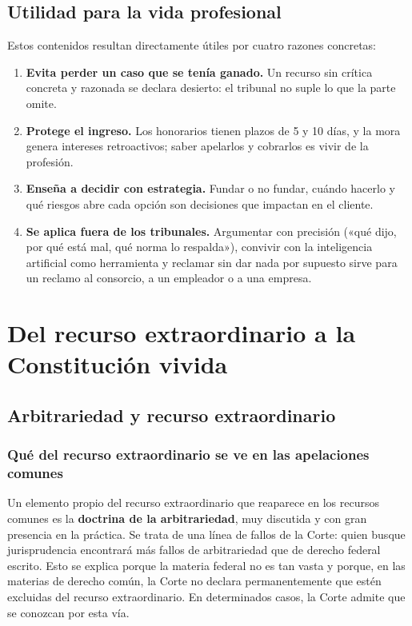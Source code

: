 \documentclass[12pt,oneside]{book}
\begin{document}
\section{Utilidad para la vida profesional}

\begin{note}
Estos contenidos resultan directamente útiles por cuatro razones concretas:
\begin{enumerate}
    \item \textbf{Evita perder un caso que se tenía ganado.} Un recurso sin crítica concreta y razonada se declara desierto: el tribunal no suple lo que la parte omite.
    \item \textbf{Protege el ingreso.} Los honorarios tienen plazos de 5 y 10 días, y la mora genera intereses retroactivos; saber apelarlos y cobrarlos es vivir de la profesión.
    \item \textbf{Enseña a decidir con estrategia.} Fundar o no fundar, cuándo hacerlo y qué riesgos abre cada opción son decisiones que impactan en el cliente.
    \item \textbf{Se aplica fuera de los tribunales.} Argumentar con precisión («qué dijo, por qué está mal, qué norma lo respalda»), convivir con la inteligencia artificial como herramienta y reclamar sin dar nada por supuesto sirve para un reclamo al consorcio, a un empleador o a una empresa.
\end{enumerate}
\end{note}

\chapter[Recurso extraordinario y Constitución]{Del recurso extraordinario a la Constitución vivida}

\section{Arbitrariedad y recurso extraordinario}

\subsection{Qué del recurso extraordinario se ve en las apelaciones comunes}

Un elemento propio del recurso extraordinario que reaparece en los recursos comunes es la \textbf{doctrina de la arbitrariedad}, muy discutida y con gran presencia en la práctica. Se trata de una línea de fallos de la Corte: quien busque jurisprudencia encontrará más fallos de arbitrariedad que de derecho federal escrito. Esto se explica porque la materia federal no es tan vasta y porque, en las materias de derecho común, la Corte no declara permanentemente que estén excluidas del recurso extraordinario. En determinados casos, la Corte admite que se conozcan por esta vía.
\end{document}
